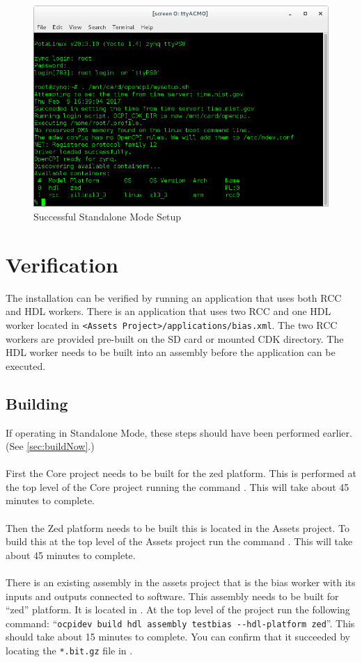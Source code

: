 \begin{figure}[H]
	\centerline{\includegraphics[scale=0.5]{zed_setup}}
	\caption{Successful Standalone Mode Setup}
	\label{fig:standalonesetup}
\end{figure}

\section{Verification}
The installation can be verified by running an application that uses both RCC and HDL workers.  There is an application that uses two RCC and one HDL worker located in \texttt{<Assets Project>/applications/bias.xml}. The two RCC workers are provided pre-built on the SD card or mounted CDK directory.  The HDL worker needs to be built into an assembly before the application can be executed.
\subsection{Building}
\label{sec:buildverify}
If operating in Standalone Mode, these steps should have been performed earlier. (See \ref{sec:buildNow}.)
\\ \\
First the Core project needs to be built for the zed platform.  This is performed at the top level of the Core project running the command .  This will take about 45 minutes to complete.
\\ \\
Then the Zed platform needs to be built this is located in the Assets project.  To build this at the top level of the Assets project run the command .  This will take about 45 minutes to complete.
\\ \\
There is an existing assembly in the assets project that is the bias worker with its inputs and outputs connected to software.  This assembly needs to be built for ``zed'' platform. It is located in .  At the top level of the project run the following command: ``\texttt{ocpidev build hdl assembly testbias -\--hdl-platform zed}''.  This should take about 15 minutes to complete. You can confirm that it succeeded by locating the \texttt{*.bit.gz} file in .\\
\newpage
